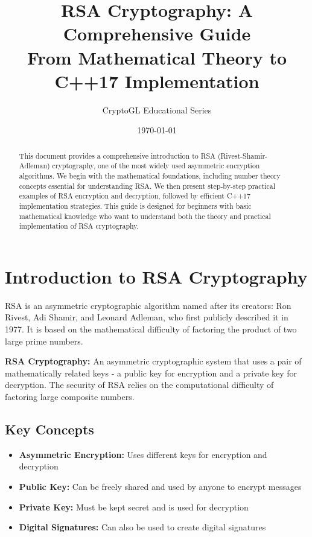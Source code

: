 \documentclass[11pt,a4paper]{article}
\title{\Huge\textbf{RSA Cryptography: A Comprehensive Guide}\\[0.5cm]
\large From Mathematical Theory to C++17 Implementation}
\author{CryptoGL Educational Series}
\date{\today}
\begin{document}
\maketitle

\begin{abstract}
This document provides a comprehensive introduction to RSA (Rivest-Shamir-Adleman) cryptography, one of the most widely used asymmetric encryption algorithms. We begin with the mathematical foundations, including number theory concepts essential for understanding RSA. We then present step-by-step practical examples of RSA encryption and decryption, followed by efficient C++17 implementation strategies. This guide is designed for beginners with basic mathematical knowledge who want to understand both the theory and practical implementation of RSA cryptography.
\end{abstract}

\tableofcontents
\newpage

\section{Introduction to RSA Cryptography}

RSA is an asymmetric cryptographic algorithm named after its creators: Ron Rivest, Adi Shamir, and Leonard Adleman, who first publicly described it in 1977. It is based on the mathematical difficulty of factoring the product of two large prime numbers.

\begin{definitionbox}
\textbf{RSA Cryptography:} An asymmetric cryptographic system that uses a pair of mathematically related keys - a public key for encryption and a private key for decryption. The security of RSA relies on the computational difficulty of factoring large composite numbers.
\end{definitionbox}

\subsection{Key Concepts}

\begin{itemize}
    \item \textbf{Asymmetric Encryption:} Uses different keys for encryption and decryption
    \item \textbf{Public Key:} Can be freely shared and used by anyone to encrypt messages
    \item \textbf{Private Key:} Must be kept secret and is used for decryption
    \item \textbf{Digital Signatures:} Can also be used to create digital signatures
\end{itemize}
\end{document}
